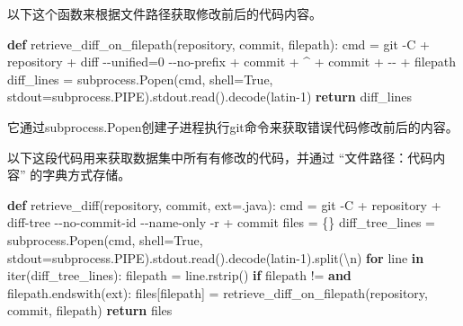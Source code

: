 \documentclass[
]{article}
\newenvironment{Shaded}{}{}
\newcommand{\BuiltInTok}[1]{\textcolor[rgb]{0.00,0.50,0.00}{#1}}
\newcommand{\CharTok}[1]{\textcolor[rgb]{0.25,0.44,0.63}{#1}}
\newcommand{\ControlFlowTok}[1]{\textcolor[rgb]{0.00,0.44,0.13}{\textbf{#1}}}
\newcommand{\KeywordTok}[1]{\textcolor[rgb]{0.00,0.44,0.13}{\textbf{#1}}}
\newcommand{\NormalTok}[1]{#1}
\newcommand{\OperatorTok}[1]{\textcolor[rgb]{0.40,0.40,0.40}{#1}}
\newcommand{\StringTok}[1]{\textcolor[rgb]{0.25,0.44,0.63}{#1}}
\newcommand{\VariableTok}[1]{\textcolor[rgb]{0.10,0.09,0.49}{#1}}
\begin{document}
以下这个函数来根据文件路径获取修改前后的代码内容。

\begin{Shaded}
  \begin{Highlighting}[]
    \KeywordTok{def}\NormalTok{ retrieve\_diff\_on\_filepath(repository, commit, filepath):}
    \NormalTok{    cmd }\OperatorTok{=} \StringTok{\textquotesingle{}git {-}C \textquotesingle{}} \OperatorTok{+}\NormalTok{ repository }\OperatorTok{+} \StringTok{\textquotesingle{} diff {-}{-}unified=0 {-}{-}no{-}prefix \textquotesingle{}} \OperatorTok{+}\NormalTok{ commit }\OperatorTok{+} \StringTok{\textquotesingle{}\^{} \textquotesingle{}} \OperatorTok{+}\NormalTok{ commit }\OperatorTok{+} \StringTok{\textquotesingle{} {-}{-} \textquotesingle{}} \OperatorTok{+}\NormalTok{ filepath}
    \NormalTok{    diff\_lines }\OperatorTok{=}\NormalTok{ subprocess.Popen(cmd, shell}\OperatorTok{=}\VariableTok{True}\NormalTok{, stdout}\OperatorTok{=}\NormalTok{subprocess.PIPE).stdout.read().decode(}\StringTok{\textquotesingle{}latin{-}1\textquotesingle{}}\NormalTok{)}
    \ControlFlowTok{return}\NormalTok{ diff\_lines}
  \end{Highlighting}
\end{Shaded}

它通过subprocess.Popen创建子进程执行git命令来获取错误代码修改前后的内容。

以下这段代码用来获取数据集中所有有修改的代码，并通过
``文件路径：代码内容'' 的字典方式存储。

\begin{Shaded}
  \begin{Highlighting}[]
    \KeywordTok{def}\NormalTok{ retrieve\_diff(repository, commit, ext}\OperatorTok{=}\StringTok{\textquotesingle{}.java\textquotesingle{}}\NormalTok{):}
    \NormalTok{    cmd }\OperatorTok{=} \StringTok{\textquotesingle{}git {-}C \textquotesingle{}} \OperatorTok{+}\NormalTok{ repository }\OperatorTok{+} \StringTok{\textquotesingle{} diff{-}tree {-}{-}no{-}commit{-}id {-}{-}name{-}only {-}r \textquotesingle{}} \OperatorTok{+}\NormalTok{ commit}
    \NormalTok{    files }\OperatorTok{=}\NormalTok{ \{\}}
    \NormalTok{    diff\_tree\_lines }\OperatorTok{=}\NormalTok{ subprocess.Popen(cmd, shell}\OperatorTok{=}\VariableTok{True}\NormalTok{, stdout}\OperatorTok{=}\NormalTok{subprocess.PIPE).stdout.read().decode(}\StringTok{\textquotesingle{}latin{-}1\textquotesingle{}}\NormalTok{).split(}\StringTok{\textquotesingle{}}\CharTok{\textbackslash{}n}\StringTok{\textquotesingle{}}\NormalTok{)}
    \ControlFlowTok{for}\NormalTok{ line }\KeywordTok{in} \BuiltInTok{iter}\NormalTok{(diff\_tree\_lines):}
    \NormalTok{        filepath }\OperatorTok{=}\NormalTok{ line.rstrip()}
    \ControlFlowTok{if}\NormalTok{ filepath }\OperatorTok{!=} \StringTok{\textquotesingle{}\textquotesingle{}} \KeywordTok{and}\NormalTok{ filepath.endswith(ext):}
    \NormalTok{            files[filepath] }\OperatorTok{=}\NormalTok{ retrieve\_diff\_on\_filepath(repository, commit, filepath)}
    \ControlFlowTok{return}\NormalTok{ files}
  \end{Highlighting}
\end{Shaded}
\end{document}
